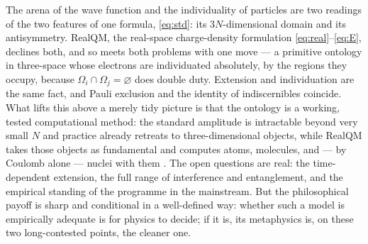 \documentclass[11pt]{article}
\begin{document}
The arena of the wave function and the individuality of particles are two readings of the two features of
one formula, \eqref{eq:std}: its $3N$-dimensional domain and its antisymmetry. RealQM, the real-space
charge-density formulation \eqref{eq:real}--\eqref{eq:E}, declines both, and so meets both problems with one
move --- a primitive ontology in three-space whose electrons are individuated absolutely, by the regions
they occupy, because $\Omega_i\cap\Omega_j=\varnothing$ does double duty. Extension and individuation are
the same fact, and Pauli exclusion and the identity of indiscernibles coincide. What lifts this above a
merely tidy picture is that the ontology is a working, tested computational method: the standard amplitude
is intractable beyond very small $N$ and practice already retreats to three-dimensional objects, while
RealQM takes those objects as fundamental and computes atoms, molecules, and --- by Coulomb alone --- nuclei
with them \cite{RealQMatoms,RealNucleus,QCDBinding}. The open questions are real: the time-dependent
extension, the full range of interference and entanglement, and the empirical standing of the programme in
the mainstream. But the philosophical payoff is sharp and conditional in a well-defined way: whether such a
model is empirically adequate is for physics to decide; if it is, its metaphysics is, on these two
long-contested points, the cleaner one.
\end{document}
